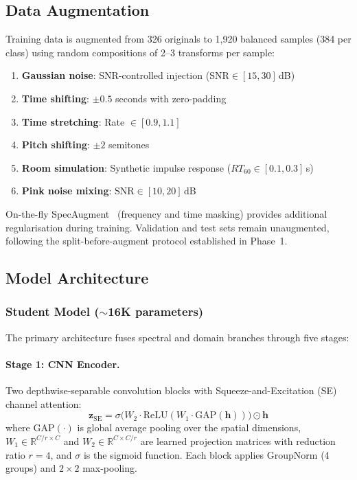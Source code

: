 \documentclass[11pt,a4paper]{article}
\begin{document}
\subsection{Data Augmentation}
\label{sec:augmentation}

Training data is augmented from 326 originals to 1,920 balanced samples
(384 per class) using random compositions of 2--3 transforms per sample:

\begin{enumerate}[nosep]
  \item \textbf{Gaussian noise}: SNR-controlled injection
        ($\text{SNR} \in [15, 30]$\,dB)
  \item \textbf{Time shifting}: $\pm 0.5$ seconds with zero-padding
  \item \textbf{Time stretching}: Rate $\in [0.9, 1.1]$
  \item \textbf{Pitch shifting}: $\pm 2$ semitones
  \item \textbf{Room simulation}: Synthetic impulse response
        ($RT_{60} \in [0.1, 0.3]$\,s)
  \item \textbf{Pink noise mixing}: $\text{SNR} \in [10, 20]$\,dB
\end{enumerate}

On-the-fly SpecAugment~\cite{park2019specaugment} (frequency and time
masking) provides additional regularisation during training. Validation
and test sets remain unaugmented, following the split-before-augment
protocol established in Phase~1.

\subsection{Model Architecture}
\label{sec:architecture}

\subsubsection{Student Model ($\sim$16K parameters)}

The primary architecture fuses spectral and domain branches through
five stages:

\paragraph{Stage 1: CNN Encoder.}
Two depthwise-separable convolution blocks with Squeeze-and-Excitation
(SE) channel attention:
\begin{equation}
  \mathbf{z}_{\text{SE}} = \sigma\bigl(W_2 \cdot
  \text{ReLU}(W_1 \cdot \text{GAP}(\mathbf{h}))\bigr) \odot \mathbf{h}
  \label{eq:se}
\end{equation}
where $\text{GAP}(\cdot)$ is global average pooling over the spatial
dimensions, $W_1 \in \mathbb{R}^{C/r \times C}$ and
$W_2 \in \mathbb{R}^{C \times C/r}$ are learned projection matrices
with reduction ratio $r = 4$, and $\sigma$ is the sigmoid function.
Each block applies GroupNorm (4 groups) and $2 \times 2$ max-pooling.
\end{document}

